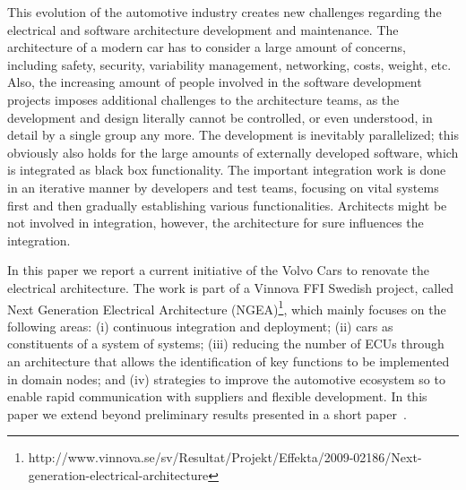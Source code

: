 \documentclass[preprint,12pt,3p]{elsarticle}
\newcommand\eric[1]{\nb{Eric}{#1}}
\begin{document}
This evolution of the automotive industry %
creates new challenges regarding the electrical and software
architecture development and maintenance. 
The architecture of a modern car has to consider a large amount of concerns, including safety, security, variability management, networking, costs, weight, etc.
Also, the increasing amount of people
involved in the software development projects imposes additional challenges to the
architecture teams, as the development and design literally cannot be
controlled, or even understood, in detail by a single group any more. The
development is inevitably parallelized\eric{BE or AE?}; this obviously also holds for the large
amounts of externally developed software, which is integrated as black box
functionality. The important integration work is done in an iterative manner by
developers and test teams, focusing on vital systems first and then gradually
establishing various functionalities. Architects might be not involved in integration, 
however, the architecture for sure influences the integration.

In this paper we report a current initiative of the Volvo Cars to renovate the
electrical architecture. 
The work is part of a Vinnova FFI Swedish project, called Next Generation Electrical Architecture
 (NGEA)\footnote{http://www.vinnova.se/sv/Resultat/Projekt/Effekta/2009-02186/Next-generation-electrical-architecture},
which mainly focuses on the following areas: (i) continuous integration and deployment; (ii)
cars as constituents of a system of systems; (iii) reducing the number of ECUs through an architecture that allows the identification of key functions to be implemented in domain nodes; and (iv) strategies to improve the automotive ecosystem so to enable rapid communication with suppliers and flexible development. In this paper we extend beyond preliminary results presented in a short paper~\cite{WasaPaper}.
 
\end{document}
